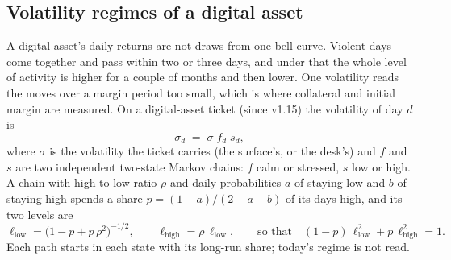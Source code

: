 \documentclass[11pt,a4paper]{article}
\let\plainsubsection\subsection
\renewcommand{\subsection}{\needspace{5\baselineskip}\plainsubsection}
\begin{document}
\subsection{Volatility regimes of a digital asset}\label{sec:regimes}
A digital asset's daily returns are not draws from one bell curve. Violent days come together and pass within two or three days, and under that the whole level of activity is higher for a couple of months and then lower. One volatility reads the moves over a margin period too small, which is where collateral and initial margin are measured. On a digital-asset ticket (since v1.15) the volatility of day $d$ is
\begin{equation}
\sigma_d \;=\; \sigma\; f_d\; s_d ,
\end{equation}
where $\sigma$ is the volatility the ticket carries (the surface's, or the desk's) and $f$ and $s$ are two independent two-state Markov chains: $f$ calm or stressed, $s$ low or high. A chain with high-to-low ratio $\rho$ and daily probabilities $a$ of staying low and $b$ of staying high spends a share $p=(1-a)/(2-a-b)$ of its days high, and its two levels are
\begin{equation}
\ell_{\mathrm{low}}=\big(1-p+p\,\rho^2\big)^{-1/2},\qquad \ell_{\mathrm{high}}=\rho\,\ell_{\mathrm{low}},\qquad\text{so that}\quad (1-p)\,\ell_{\mathrm{low}}^2+p\,\ell_{\mathrm{high}}^2=1 .
\end{equation}
Each path starts in each state with its long-run share; today's regime is not read.
\end{document}
